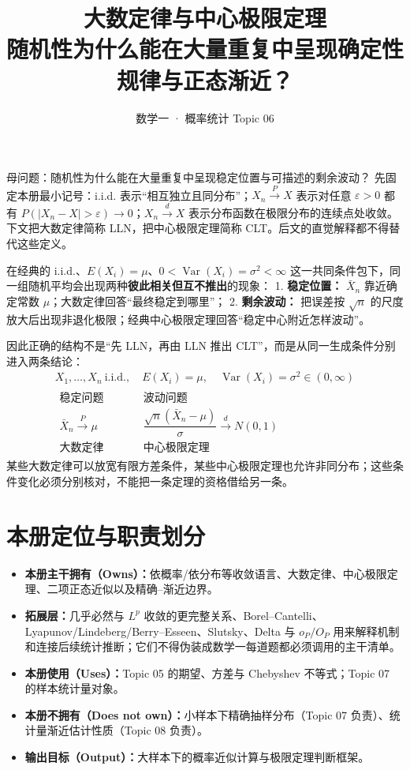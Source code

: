 \documentclass[11pt,a4paper]{ctexart}
\title{\vspace{-1.1cm}\textbf{大数定律与中心极限定理}\\[0.4em]
\large 随机性为什么能在大量重复中呈现确定性规律与正态渐近？}
\author{数学一 · 概率统计 Topic 06}
\date{}
\newcommand{\kw}[1]{\textbf{\color{deep}#1}}
\begin{document}
\maketitle

\begin{corebox}{母问题：随机性为什么能在大量重复中呈现稳定位置与可描述的剩余波动？}
先固定本册最小记号：i.i.d. 表示“相互独立且同分布”；$X_n\xrightarrow{P}X$ 表示对任意 $\varepsilon>0$ 都有 $P(\lvert X_n-X\rvert>\varepsilon)\to0$；$X_n\xrightarrow{d}X$ 表示分布函数在极限分布的连续点处收敛。下文把大数定律简称 LLN，把中心极限定理简称 CLT。后文的直觉解释都不得替代这些定义。

在经典的 i.i.d.、$E(X_i)=\mu$、$0<\operatorname{Var}(X_i)=\sigma^2<\infty$ 这一共同条件包下，同一组随机平均会出现两种\textbf{彼此相关但互不推出}的现象：
1. \kw{稳定位置：} $\bar X_n$ 靠近确定常数 $\mu$；大数定律回答“最终稳定到哪里”；
2. \kw{剩余波动：} 把误差按 $\sqrt n$ 的尺度放大后出现非退化极限；经典中心极限定理回答“稳定中心附近怎样波动”。

因此正确的结构不是“先 LLN，再由 LLN 推出 CLT”，而是从同一生成条件分别进入两条结论：
\[
\boxed{
\begin{array}{c}
X_1,\ldots,X_n\ \text{i.i.d.},\quad E(X_i)=\mu,\quad \operatorname{Var}(X_i)=\sigma^2\in(0,\infty)\\[0.5em]
\begin{array}{ccc}
\text{稳定问题} & & \text{波动问题}\\[-0.1em]
\bar X_n\xrightarrow{P}\mu & \qquad &
\dfrac{\sqrt n(\bar X_n-\mu)}{\sigma}\xrightarrow{d}N(0,1)\\
\text{大数定律} && \text{中心极限定理}
\end{array}
\end{array}}
\]
某些大数定律可以放宽有限方差条件，某些中心极限定理也允许非同分布；这些条件变化必须分别核对，不能把一条定理的资格借给另一条。
\end{corebox}

\section{本册定位与职责划分}

\begin{itemize}
  \item \kw{本册主干拥有（Owns）：}依概率/依分布等收敛语言、大数定律、中心极限定理、二项正态近似以及精确--渐近边界。
  \item \kw{拓展层：}几乎必然与 $L^p$ 收敛的更完整关系、Borel--Cantelli、Lyapunov/Lindeberg/Berry--Esseen、Slutsky、Delta 与 $o_P/O_P$ 用来解释机制和连接后续统计推断；它们不得伪装成数学一每道题都必须调用的主干清单。
  \item \kw{本册使用（Uses）：}Topic 05 的期望、方差与 Chebyshev 不等式；Topic 07 的样本统计量对象。
  \item \kw{本册不拥有（Does not own）：}小样本下精确抽样分布（Topic 07 负责）、统计量渐近估计性质（Topic 08 负责）。
  \item \kw{输出目标（Output）：}大样本下的概率近似计算与极限定理判断框架。
\end{itemize}
\end{document}
